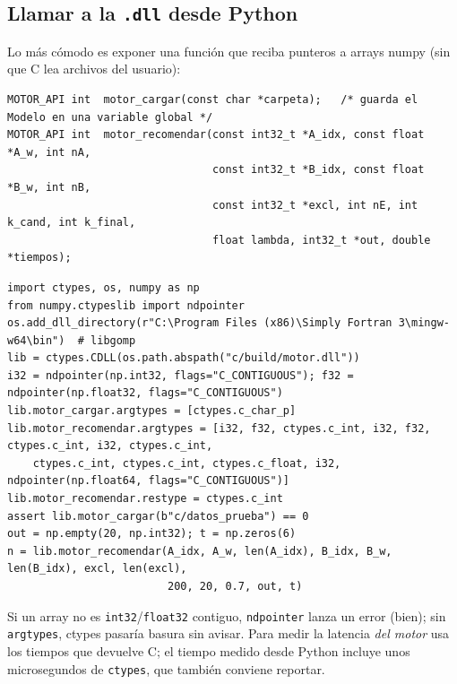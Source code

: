 \documentclass[a4paper,11pt]{article}
\newcommand{\cod}[1]{\texttt{#1}}
\begin{document}
\subsection{Llamar a la \texttt{.dll} desde Python}
Lo más cómodo es exponer una función que reciba punteros a arrays numpy (sin que C lea archivos del usuario):
\begin{lstlisting}[style=c]
MOTOR_API int  motor_cargar(const char *carpeta);   /* guarda el Modelo en una variable global */
MOTOR_API int  motor_recomendar(const int32_t *A_idx, const float *A_w, int nA,
                                const int32_t *B_idx, const float *B_w, int nB,
                                const int32_t *excl, int nE, int k_cand, int k_final,
                                float lambda, int32_t *out, double *tiempos);
\end{lstlisting}
\begin{lstlisting}[style=py]
import ctypes, os, numpy as np
from numpy.ctypeslib import ndpointer
os.add_dll_directory(r"C:\Program Files (x86)\Simply Fortran 3\mingw-w64\bin")  # libgomp
lib = ctypes.CDLL(os.path.abspath("c/build/motor.dll"))
i32 = ndpointer(np.int32, flags="C_CONTIGUOUS"); f32 = ndpointer(np.float32, flags="C_CONTIGUOUS")
lib.motor_cargar.argtypes = [ctypes.c_char_p]
lib.motor_recomendar.argtypes = [i32, f32, ctypes.c_int, i32, f32, ctypes.c_int, i32, ctypes.c_int,
    ctypes.c_int, ctypes.c_int, ctypes.c_float, i32, ndpointer(np.float64, flags="C_CONTIGUOUS")]
lib.motor_recomendar.restype = ctypes.c_int
assert lib.motor_cargar(b"c/datos_prueba") == 0
out = np.empty(20, np.int32); t = np.zeros(6)
n = lib.motor_recomendar(A_idx, A_w, len(A_idx), B_idx, B_w, len(B_idx), excl, len(excl),
                         200, 20, 0.7, out, t)
\end{lstlisting}
\begin{ojo}[ctypes]
Si un array no es \cod{int32}/\cod{float32} contiguo, \cod{ndpointer} lanza un error (bien); sin \cod{argtypes},
ctypes pasaría basura sin avisar. Para medir la latencia \emph{del motor} usa los tiempos que devuelve C; el tiempo
medido desde Python incluye unos microsegundos de \cod{ctypes}, que también conviene reportar.
\end{ojo}
\end{document}
